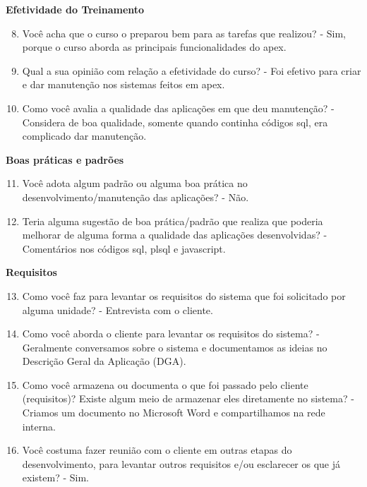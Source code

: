 \begin{apendicesenv}
\textbf{Efetividade do Treinamento}

\begin{enumerate}
	\setcounter{enumi}{7}
	\item Você acha que o curso o preparou bem para as tarefas que realizou?\newline
	- Sim, porque o curso aborda as principais funcionalidades do apex.
	\item Qual a sua opinião com relação a efetividade do curso?\newline
	- Foi efetivo para criar e dar manutenção nos sistemas feitos em apex.
	\item Como você avalia a qualidade das aplicações em que deu manutenção?\newline
	- Considera de boa qualidade, somente quando continha códigos sql, era complicado dar manutenção.
\end{enumerate}

\textbf{Boas práticas e padrões}

\begin{enumerate}
	\setcounter{enumi}{10}
	\item Você adota algum padrão ou alguma boa prática no desenvolvimento/manutenção das
	aplicações?\newline
	- Não.
	\item Teria alguma sugestão de boa prática/padrão que realiza que poderia melhorar de
	alguma forma a qualidade das aplicações desenvolvidas?\newline
	- Comentários nos códigos sql, plsql e javascript.
\end{enumerate}

\textbf{Requisitos}

\begin{enumerate}
	\setcounter{enumi}{12}
	\item Como você faz para levantar os requisitos do sistema que foi solicitado por alguma
	unidade?\newline
	- Entrevista com o cliente.
	\item Como você aborda o cliente para levantar os requisitos do sistema?\newline
	- Geralmente conversamos sobre o sistema e documentamos as ideias no Descrição Geral da Aplicação (DGA).
	\item Como você armazena ou documenta o que foi passado pelo cliente (requisitos)? Existe
	algum meio de armazenar eles diretamente no sistema?\newline
	- Criamos um documento no Microsoft Word e compartilhamos na rede interna.
	\item Você costuma fazer reunião com o cliente em outras etapas do desenvolvimento, para
	levantar outros requisitos e/ou esclarecer os que já existem?\newline
	- Sim.
\end{enumerate}


\end{apendicesenv}
